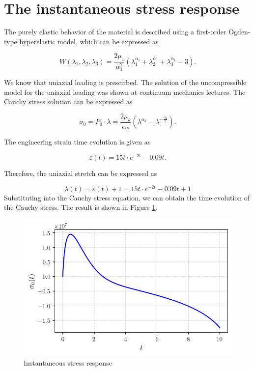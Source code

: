 \documentclass[12pt,a4paper]{article}
\begin{document}
\section{The instantaneous stress response}

The purely elastic behavior of the material is described using a first-order Ogden-type hyperelastic model, which can be expressed as 

\begin{equation}
    W(\lambda_1, \lambda_2, \lambda_3) = \frac{2\mu_1}{\alpha_1^2} \left( \lambda_1^{\alpha_1} + \lambda_2^{\alpha_1} + \lambda_3^{\alpha_1} - 3 \right).
\end{equation}

We know that uniaxial loading is prescirbed. The solution of the uncompressible model for the uniaxial loading was shown at continuum mechanics lectures. The Cauchy stress solution can be expressed as

\begin{equation}
\sigma_0 = P_0\cdot\lambda = \frac{2\mu_k}{\alpha_k}(\lambda^{\alpha_k} - \lambda^{-\frac{\alpha_k}{2}}).
\end{equation}

The engineering strain time evolution is given as

\begin{equation}
\varepsilon(t) = 15t\cdot e^{-2t}-0.09t.
\end{equation}

Therefore, the uniaxial stretch can be expressed as

$$
\lambda(t) = \varepsilon(t) + 1 = 15t\cdot e^{-2t}-0.09t + 1
$$
Substituting into the Cauchy stress equation, we can obtain the time evolution of the Cauchy stress. The result is shown in Figure \ref{fig:instantaneous_stress}.
\begin{figure}[H]
    \centering
    \includegraphics[scale=0.8]{figures/elastic_solution.png}
    \caption{Instantaneous stress response}
 \label{fig:instantaneous_stress}
\end{figure}
\end{document}
